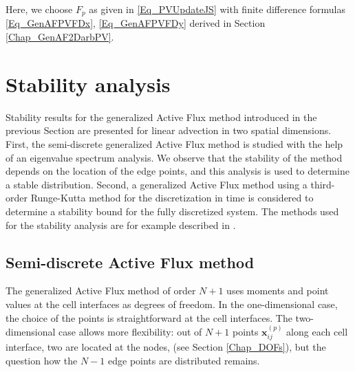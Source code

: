 \documentclass[12pt,a4paper]{article}
\begin{document}
Here, we choose $F_p$ as given in \eqref{Eq_PVUpdateJS} with finite difference formulas \eqref{Eq_GenAFPVFDx}, \eqref{Eq_GenAFPVFDy} derived in Section \ref{Chap_GenAF2DarbPV}.






\section{Stability analysis}
\label{Chap_StabilityAnalysis}
Stability results for the generalized Active Flux method introduced in the previous Section are presented for linear advection in two spatial dimensions.
First, the semi-discrete generalized Active Flux method is studied with the help of an eigenvalue spectrum analysis. We observe that the stability of the method depends on the location of the edge points, and this analysis is used to determine a stable distribution. Second, a generalized Active Flux method using a third-order Runge-Kutta method for the discretization in time is considered to determine a stability bound for the fully discretized system. 
The methods used for the stability analysis are for example described in \cite{Lomax2001}.

\subsection{Semi-discrete Active Flux method}
\label{Chap_StabAnaSemiDiscreteGenAF}
The generalized Active Flux method of order $N+1$ uses moments and point values at the cell interfaces as degrees of freedom. In the one-dimensional case, the choice of the points is straightforward at the cell interfaces. The two-dimensional case allows more flexibility: out of $N+1$ points \(\mathbf x_{ij}^{(p)}\) along each cell interface, two are located at the nodes, (see Section \ref{Chap_DOFs}), but the question how the $N-1$ edge points are distributed remains.
\end{document}
